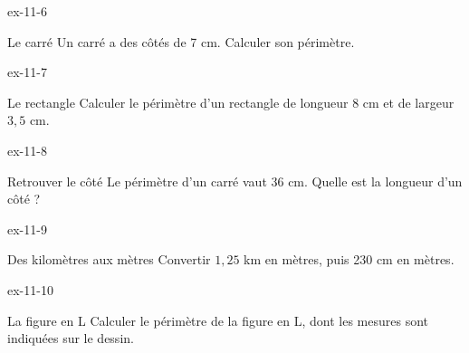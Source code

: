 \begin{blocLivre}{ex-11-6}\begin{exercice}[2]{Le carré}
Un carré a des côtés de 7 cm. Calculer son périmètre.
\label{fig-ex-11-6}
\end{exercice}\end{blocLivre}
\begin{blocLivre}{ex-11-7}\begin{exercice}[2]{Le rectangle}
Calculer le périmètre d’un rectangle de longueur 8 cm et de largeur $3{,}5$ cm.
\label{fig-ex-11-7}
\end{exercice}\end{blocLivre}
\begin{blocLivre}{ex-11-8}\begin{exercice}[2]{Retrouver le côté}
Le périmètre d’un carré vaut 36 cm. Quelle est la longueur d’un côté ?
\end{exercice}\end{blocLivre}
\begin{blocLivre}{ex-11-9}\begin{exercice}[2]{Des kilomètres aux mètres}
Convertir $1{,}25$ km en mètres, puis 230 cm en mètres.
\end{exercice}\end{blocLivre}
\begin{blocLivre}{ex-11-10}\begin{exercice}[2]{La figure en L}
Calculer le périmètre de la figure en L, dont les mesures sont indiquées sur le dessin.
\label{fig-ex-11-10}
\end{exercice}\end{blocLivre}

